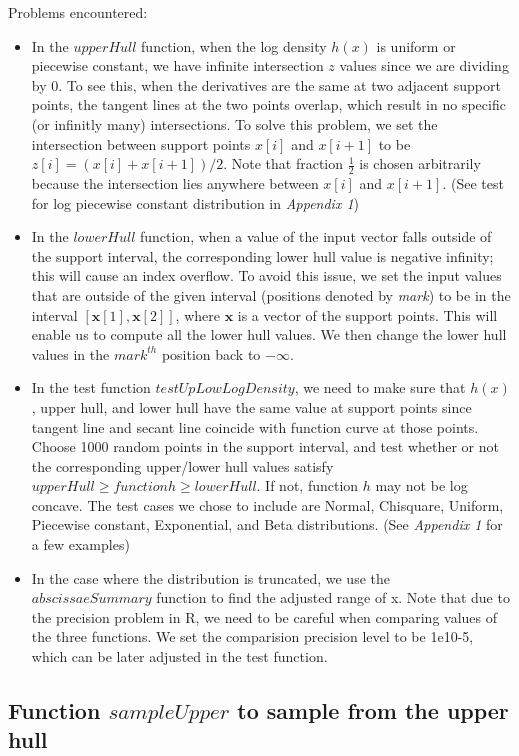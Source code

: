 \documentclass{article}\usepackage[]{graphicx}\usepackage[]{color}
\begin{document}
\noindent Problems encountered:
\begin{itemize}
\item In the $upperHull$ function, when the log density $h(x)$ is uniform or piecewise constant, we have infinite intersection $z$ values since we are dividing by 0. To see this, when the derivatives are the same at two adjacent support points, the tangent lines at the two points overlap, which result in no specific (or infinitly many) intersections. To solve this problem, we set the intersection between support points $x[i]$ and $x[i+1]$ to be $z[i] = (x[i]+x[i+1])/2$. Note that fraction $\frac{1}{2}$ is chosen arbitrarily because the intersection lies anywhere between $x[i]$ and $x[i+1]$. (See test for log piecewise constant distribution in {\em Appendix 1})
\item In the $lowerHull$ function, when a value of the input vector falls outside of the support interval, the corresponding lower hull value is negative infinity; this will cause an index overflow. To avoid this issue, we set the input values that are outside of the given interval (positions denoted by {\em mark}) to be in the interval $[ \mathbf{x}[1], \mathbf{x}[2] ]$, where $\mathbf{x}$ is a vector of the support points. This will enable us to compute all the lower hull values. We then change the lower hull values in the $mark^{th}$ position back to $- \infty $.
\item In the test function $testUpLowLogDensity$, we need to make sure that $h(x)$, upper hull, and lower hull have the same value at support points since tangent line and secant line coincide with function curve at those points. Choose 1000 random points in the support interval, and test whether or not the corresponding upper/lower hull values satisfy $upperHull \geq function h \geq lowerHull$. If not, function $h$ may not be log concave. The test cases we chose to include are Normal, Chisquare, Uniform, Piecewise constant, Exponential, and Beta distributions. (See {\em Appendix 1} for a few examples)
\item In the case where the distribution is truncated, we use the $abscissaeSummary$ function to find the adjusted range of x. Note that due to the precision problem in R, we need to be careful when comparing values of the three functions. We set the comparision precision level to be 1e10-5, which can be later adjusted in the test function.
\end{itemize}

\subsection{Function $sampleUpper$ to sample from the upper hull}
\end{document}
